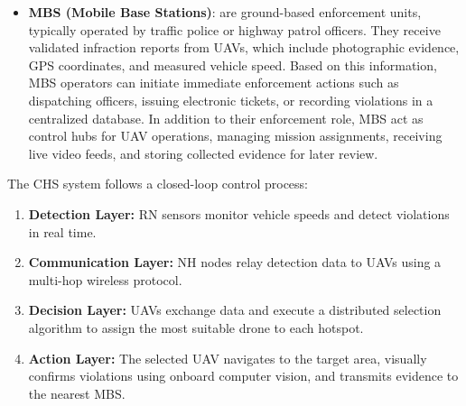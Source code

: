 \begin{itemize}
    \item \textbf{MBS (Mobile Base Stations)}: are ground-based enforcement units, typically operated by traffic police or highway patrol officers. They receive validated infraction reports from UAVs, which include photographic evidence, GPS coordinates, and measured vehicle speed. Based on this information, MBS operators can initiate immediate enforcement actions such as dispatching officers, issuing electronic tickets, or recording violations in a centralized database. In addition to their enforcement role, MBS act as control hubs for UAV operations, managing mission assignments, receiving live video feeds, and storing collected evidence for later review.
\end{itemize}



The CHS system follows a closed-loop control process:
\begin{enumerate}[label=\arabic*., leftmargin=2em]
    \item \textbf{Detection Layer:} RN sensors monitor vehicle speeds and detect violations in real time.
    \item \textbf{Communication Layer:} NH nodes relay detection data to UAVs using a multi-hop wireless protocol.
    \item \textbf{Decision Layer:} UAVs exchange data and execute a distributed selection algorithm to assign the most suitable drone to each hotspot.
    \item \textbf{Action Layer:} The selected UAV navigates to the target area, visually confirms violations using onboard computer vision, and transmits evidence to the nearest MBS.
\end{enumerate}


